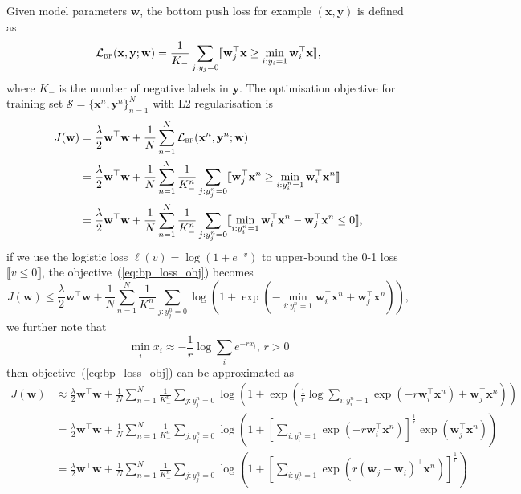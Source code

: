 \documentclass[9pt]{extarticle}
\newcommand{\llb}{\llbracket}
\newcommand{\rrb}{\rrbracket}
\newcommand{\x}{\mathbf{x}}
\newcommand{\y}{\mathbf{y}}
\newcommand{\1}{\mathbf{1}}
\newcommand{\w}{\mathbf{w}}
\newcommand{\LCal}{\mathcal{L}}
\newcommand{\SCal}{\mathcal{S}}
\begin{document}
Given model parameters $\w$, the bottom push loss for example $(\x, \y)$ is defined as
\begin{equation}
\label{eq:bpush_loss}
\LCal_\textsc{bp}(\x, \y; \w) = \frac{1}{K_-} \sum_{j:y_j=0} \llb \w_j^\top \x \ge \min_{i:y_i=1} \w_i^\top \x \rrb,
\end{equation}
where $K_-$ is the number of negative labels in $\y$.
The optimisation objective for training set $\SCal = \{\x^n, \y^n\}_{n=1}^N$ with L2 regularisation is
\begin{equation}
\label{eq:bp_loss_obj}
\begin{aligned}
J(\w) 
&= \frac{\lambda}{2} \w^\top \w + \frac{1}{N} \sum_{n=1}^N \LCal_\textsc{bp}(\x^n, \y^n; \w) \\
&= \frac{\lambda}{2} \w^\top \w + \frac{1}{N} \sum_{n=1}^N
   \frac{1}{K_-^n} \sum_{j:y_j^n=0} \llb \w_j^\top \x^n \ge \min_{i:y_i^n=1} \w_i^\top \x^n \rrb \\
&= \frac{\lambda}{2} \w^\top \w + \frac{1}{N} \sum_{n=1}^N
   \frac{1}{K_-^n} \sum_{j:y_j^n=0} \llb \min_{i:y_i^n=1} \w_i^\top \x^n - \w_j^\top \x^n \le 0\rrb,
\end{aligned}
\end{equation}
if we use the logistic loss $\ell(v) = \log(1 + e^{-v})$ to upper-bound the 0-1 loss $\llb v \le 0 \rrb$, 
the objective~(\ref{eq:bp_loss_obj}) becomes
$$
J(\w) 
\le \frac{\lambda}{2} \w^\top \w + \frac{1}{N} \sum_{n=1}^N
    \frac{1}{K_-^n} \sum_{j:y_j^n=0} \log \left( 1 + 
    \exp \left( -\min_{i:y_i^n=1} \w_i^\top \x^n + \w_j^\top \x^n \right) \right),
$$
we further note that 
$$
\min_i x_i \approx -\frac{1}{r} \log \sum_i e^{-r x_i}, \, r > 0
$$
then objective~(\ref{eq:bp_loss_obj}) can be approximated as
\begin{align*}
J(\w) 
&\approx \frac{\lambda}{2} \w^\top \w + \frac{1}{N} \sum_{n=1}^N
         \frac{1}{K_-^n} \sum_{j:y_j^n=0} \log \left( 1 + 
         \exp \left( \frac{1}{r} \log \sum_{i:y_i^n=1} \exp \left( -r \w_i^\top \x^n \right) + 
         \w_j^\top \x^n \right) \right) \\
&= \frac{\lambda}{2} \w^\top \w + \frac{1}{N} \sum_{n=1}^N
   \frac{1}{K_-^n} \sum_{j:y_j^n=0} 
   \log \left( 1 + \left[ \sum_{i:y_i^n=1} \exp \left( -r \w_i^\top \x^n \right) \right]^\frac{1}{r} \exp \left( \w_j^\top \x^n \right) \right) \\
&= \frac{\lambda}{2} \w^\top \w + \frac{1}{N} \sum_{n=1}^N
   \frac{1}{K_-^n} \sum_{j:y_j^n=0} \log \left( 1 + \left[ \sum_{i:y_i^n=1} \exp \left( r (\w_j - \w_i)^\top \x^n \right) \right]^\frac{1}{r} 
   \right) \\
\end{align*}
\end{document}
